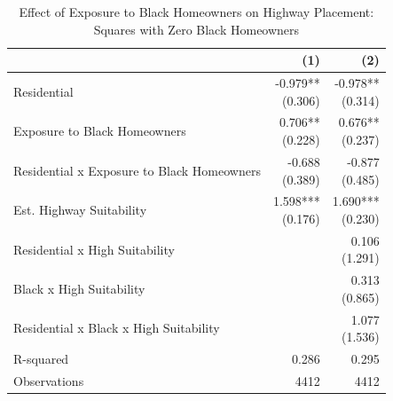 \begin{table}[h]
\centering
\caption{Effect of Exposure to Black Homeowners on Highway Placement: Squares with Zero Black Homeowners}
\label{tab:outside_corridor_black_homeowners_no_black}
\begin{threeparttable}
\begin{tabular*}{0.8\textwidth}{@{\extracolsep{\fill}}l*{2}{r}}
\toprule
 & (1) & (2) \\
\midrule
Residential & \makecell[tr]{-0.979{**} \\ (0.306)} & \makecell[tr]{-0.978{**} \\ (0.314)} \\
Exposure to Black Homeowners & \makecell[tr]{0.706{**} \\ (0.228)} & \makecell[tr]{0.676{**} \\ (0.237)} \\
Residential x Exposure to Black Homeowners & \makecell[tr]{-0.688 \\ (0.389)} & \makecell[tr]{-0.877 \\ (0.485)} \\
Est. Highway Suitability & \makecell[tr]{1.598{***} \\ (0.176)} & \makecell[tr]{1.690{***} \\ (0.230)} \\
Residential x High Suitability &  & \makecell[tr]{0.106 \\ (1.291)} \\
Black x High Suitability &  & \makecell[tr]{0.313 \\ (0.865)} \\
Residential x Black x High Suitability &  & \makecell[tr]{1.077 \\ (1.536)} \\
R-squared & 0.286 & 0.295 \\
Observations & 4412 & 4412 \\
\bottomrule
\end{tabular*}
\begin{tablenotes}[flushleft]
\footnotesize

\end{tablenotes}
\end{threeparttable}
\end{table}

